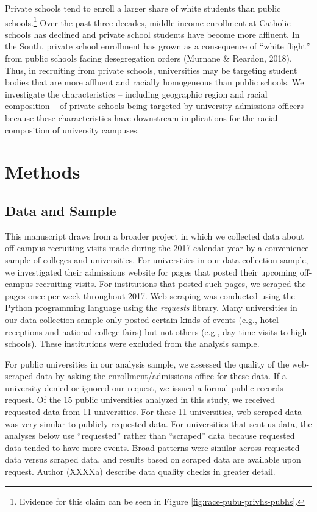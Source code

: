 \documentclass[
  12pt,
]{article}
\begin{document}
Private schools tend to enroll a larger share of white students than public schools.\footnote{Evidence for this claim can be seen in Figure \ref{fig:race-pubu-privhs-pubhs}.} Over the past three decades, middle-income enrollment at Catholic schools has declined and private school students have become more affluent. In the South, private school enrollment has grown as a consequence of ``white flight'' from public schools facing desegregation orders (Murnane \& Reardon, 2018). Thus, in recruiting from private schools, universities may be targeting student bodies that are more affluent and racially homogeneous than public schools. We investigate the characteristics -- including geographic region and racial composition -- of private schools being targeted by university admissions officers because these characteristics have downstream implications for the racial composition of university campuses.

\hypertarget{methods}{%
\section{Methods}\label{methods}}

\hypertarget{data-and-sample}{%
\subsection{Data and Sample}\label{data-and-sample}}

This manuscript draws from a broader project in which we collected data about off-campus recruiting visits made during the 2017 calendar year by a convenience sample of colleges and universities. For universities in our data collection sample, we investigated their admissions website for pages that posted their upcoming off-campus recruiting visits. For institutions that posted such pages, we scraped the pages once per week throughout 2017. Web-scraping was conducted using the Python programming language using the \emph{requests} library. Many universities in our data collection sample only posted certain kinds of events (e.g., hotel receptions and national college fairs) but not others (e.g., day-time visits to high schools). These institutions were excluded from the analysis sample.

For public universities in our analysis sample, we assessed the quality of the web-scraped data by asking the enrollment/admissions office for these data. If a university denied or ignored our request, we issued a formal public records request. Of the 15 public universities analyzed in this study, we received requested data from 11 universities. For these 11 universities, web-scraped data was very similar to publicly requested data. For universities that sent us data, the analyses below use ``requested'' rather than ``scraped'' data because requested data tended to have more events. Broad patterns were similar across requested data versus scraped data, and results based on scraped data are available upon request. Author (XXXXa) describe data quality checks in greater detail.
\end{document}
